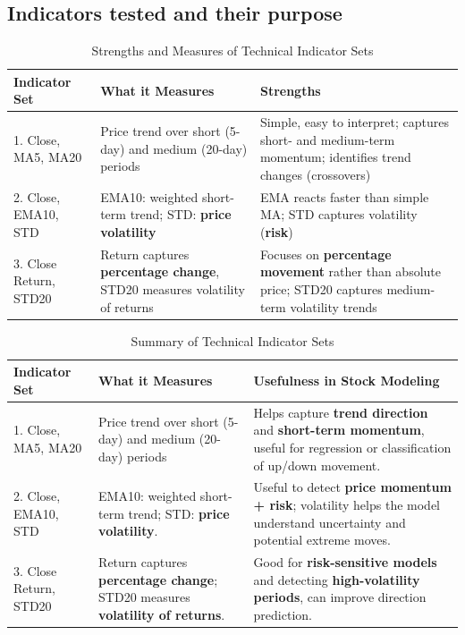 \FloatBarrier
\clearpage
\subsection{Indicators tested and their purpose}

\begin{table}[h!]
    \centering
    \caption{Strengths and Measures of Technical Indicator Sets}
    \label{tab:indicator_strengths}
    \begin{tabular}{|l|p{4cm}|p{6.5cm}|}
        \hline
        \textbf{Indicator Set} & \textbf{What it Measures} & \textbf{Strengths} \\
        \hline
        1. Close, MA5, MA20 & Price trend over short (5-day) and medium (20-day) periods & Simple, easy to interpret; captures short- and medium-term momentum; identifies trend changes (crossovers) \\
        \hline
        2. Close, EMA10, STD & EMA10: weighted short-term trend; STD: \textbf{price volatility} & EMA reacts faster than simple MA; STD captures volatility (\textbf{risk}) \\
        \hline
        3. Close Return, STD20 & Return captures \textbf{percentage change}, STD20 measures volatility of returns & Focuses on \textbf{percentage movement} rather than absolute price; STD20 captures medium-term volatility trends \\
        \hline
    \end{tabular}
\end{table}

\begin{table}[h!]
    \centering
    \caption{Summary of Technical Indicator Sets}
    \label{tab:indicator_sets_summary}
    \begin{tabular}{|l|p{4cm}|p{6cm}|}
        \hline
        \textbf{Indicator Set} & \textbf{What it Measures} & \textbf{Usefulness in Stock Modeling} \\
        \hline
        1. Close, MA5, MA20 & Price trend over short (5-day) and medium (20-day) periods & Helps capture \textbf{trend direction} and \textbf{short-term momentum}, useful for regression or classification of up/down movement. \\
        \hline
        2. Close, EMA10, STD & EMA10: weighted short-term trend; STD: \textbf{price volatility}. & Useful to detect \textbf{price momentum + risk}; volatility helps the model understand uncertainty and potential extreme moves. \\
        \hline
        3. Close Return, STD20 & Return captures \textbf{percentage change}; STD20 measures \textbf{volatility of returns}. & Good for \textbf{risk-sensitive models} and detecting \textbf{high-volatility periods}, can improve direction prediction. \\
        \hline
    \end{tabular}
\end{table}


